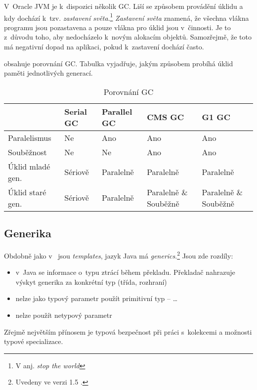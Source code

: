 V~Oracle JVM je k~dispozici několik GC. Liší se způsobem provádění úklidu a kdy dochází k~tzv. \emph{zastavení světa}.\footnote{V anj. \emph{stop the world}}
\emph{Zastavení světa} znamená, že všechna vlákna programu jsou pozastavena a pouze vlákna pro úklid jsou v~činnosti.
Je to z~důvodu toho, aby nedocházelo k~novým alokacím objektů.
Samozřejmě, že toto má negativní dopad na aplikaci, pokud k~zastavení dochází často.

 obsahuje porovnání GC. Tabulka vyjadřuje, jakým způsobem probíhá úklid paměti jednotlivých generací.

\begin{table}
\center
\begin{tabular}{|l || l | l | p{2cm} | p{2cm} |}
\hline
& Serial GC & Parallel GC & CMS GC & G1 GC \\ \hline \hline
Paralelismus & Ne & Ano & Ano & Ano \\ \hline
Souběžnost & Ne & Ne & Ano & Ano \\ \hline
Úklid mladé gen. & Sériově & Paralelně & Paralelně & Paralelně \\ \hline
Úklid staré gen. & Sériově & Paralelně & Paralelně \& \mbox{Souběžně} & Paralelně \& \mbox{Souběžně} \\
 \hline
\end{tabular}
\caption{Porovnání GC}
\label{tab:gcs}
\end{table}

\subsection{Generika\label{sub:generika}}

Obdobně jako v~\CC{} jsou \emph{templates}\cite{ISO:2012:CPP}, jazyk Java má \emph{generics}.\footnote{Uvedeny ve verzi 1.5 \cite{gosling2013java}.}
Jsou zde rozdíly:
\begin{itemize}
  \item v~Java se informace o~typu ztrácí během překladu. Překladač nahrazuje výskyt generika za konkrétní typ (třída, rozhraní)
  \item nelze jako typový parametr použít primitivní typ --  \ldots{}
  \item nelze použít netypový parametr
\end{itemize}

Zřejmě největším přínosem je typová bezpečnost při práci s~kolekcemi a možnosti typové specializace.

